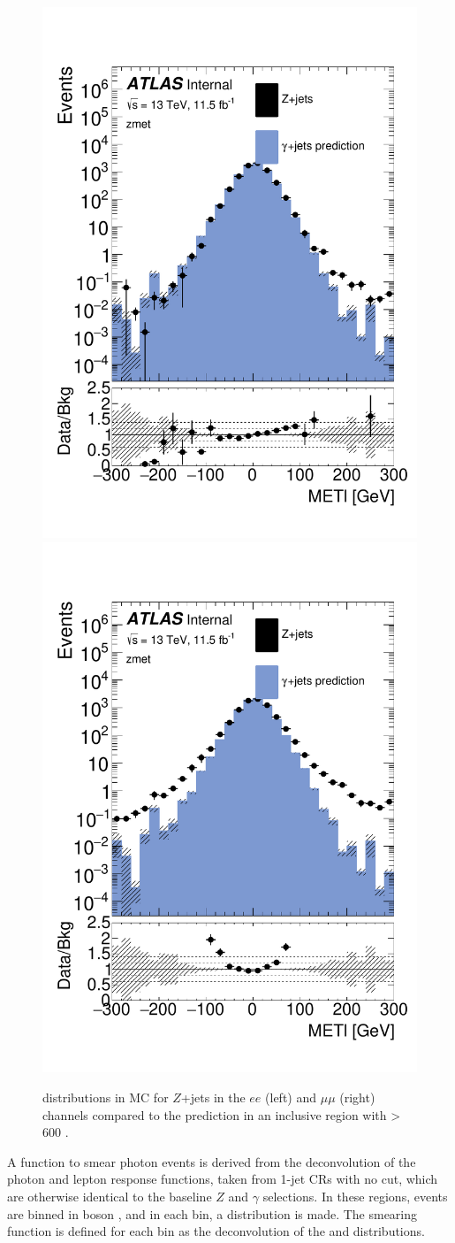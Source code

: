 \begin{centering}
\begin{figure}[!hbt]
\myfloatalign
\includegraphics[width=.45\linewidth]{figures/photons/MC_hist_METl_Pt_0_ee_2j_2016_mcmetl_ptrw__zmet_.pdf}
\includegraphics[width=.45\linewidth]{figures/photons/MC_hist_METl_Pt_0_mm_2j_2016_mcmetl_ptrw__zmet_.pdf}
\caption{\metl distributions in \ac{MC} for $Z$+jets in the $ee$ (left) and $\mu\mu$ (right) channels compared to the \gjets prediction in an inclusive region with \HT > 600 \gev.}
\label{fig:photon_metparallel}
\end{figure}
\end{centering}

A function to smear photon events is derived from the deconvolution of the photon and lepton response functions, taken from 1-jet \acp{CR} with no \HT cut, which are otherwise identical to the baseline $Z$ and $\gamma$ selections. %
In these regions, events are binned in boson \pt, and in each bin, a \metl distribution is made. The smearing function is defined for each bin as the deconvolution of the \dyjets and \gjets \metl distributions. 

